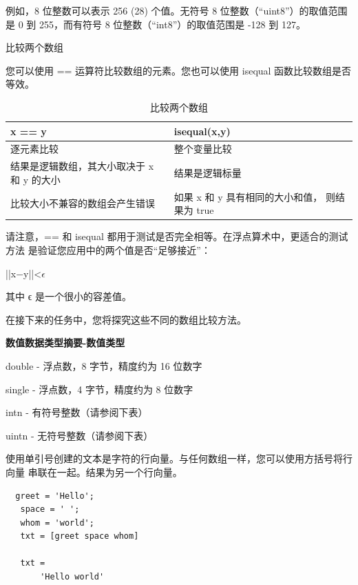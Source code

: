 \documentclass[12pt,a4paper]{article}
\begin{document}
例如，8 位整数可以表示 256 (28) 个值。无符号 8 位整数（“uint8”）的取值范围
是 0 到 255，而有符号 8 位整数（“int8”）的取值范围是 -128 到 127。

比较两个数组

您可以使用 == 运算符比较数组的元素。您也可以使用 isequal 函数比较数组是否等效。

\begin{table}[htbp]
    \begin{center}
        \caption{比较两个数组}
         \begin{tabular}{|p{9cm}|p{8cm}|}
            \hline
            \textbf{x == y} & \textbf{isequal(x,y)} \\
            \hline
            逐元素比较  & 整个变量比较 \\
            \hline
            结果是逻辑数组，其大小取决于 x 和 y 的大小 & 结果是逻辑标量 \\
            \hline
            比较大小不兼容的数组会产生错误& 如果 x 和 y 具有相同的大小和值，
            则结果为 true \\    
            \hline        
        \end{tabular}
    \end{center}
\end{table}

请注意，== 和 isequal 都用于测试是否完全相等。在浮点算术中，更适合的测试方法
是验证您应用中的两个值是否“足够接近”：

||x−y||<$\epsilon$

其中 ϵ 是一个很小的容差值。

在接下来的任务中，您将探究这些不同的数组比较方法。

\textbf{数值数据类型摘要-数值类型}

double - 浮点数，8 字节，精度约为 16 位数字

single - 浮点数，4 字节，精度约为 8 位数字

intn - 有符号整数（请参阅下表）

uintn - 无符号整数（请参阅下表）

使用单引号创建的文本是字符的行向量。与任何数组一样，您可以使用方括号将行向量
串联在一起。结果为另一个行向量。

\begin{lstlisting}
  greet = 'Hello';
   space = ' ';
   whom = 'world';
   txt = [greet space whom]

   txt =
       'Hello world'
\end{lstlisting}
\end{document}

